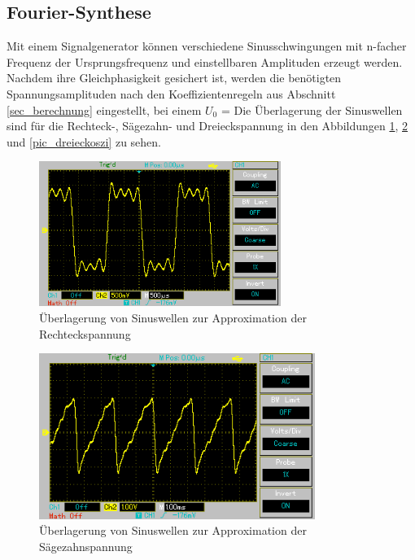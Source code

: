\subsection{Fourier-Synthese}
\label{sec_fourier}
Mit einem Signalgenerator können verschiedene Sinusschwingungen mit n-facher Frequenz der Ursprungsfrequenz und einstellbaren Amplituden
erzeugt werden. Nachdem ihre Gleichphasigkeit gesichert ist, werden die benötigten Spannungsamplituden nach den Koeffizientenregeln aus
Abschnitt \ref{sec_berechnung} eingestellt, bei einem $U_0$ =  Die Überlagerung der Sinuswellen sind für die Rechteck-, Sägezahn- und Dreieckspannung 
in den Abbildungen \ref{pic_rechteckoszi}, \ref{pic_saegzahnoszi} und \ref{pic_dreieckoszi} zu sehen.

\begin{figure}[H]
 \includegraphics[width = 0.7\textwidth]{pics/rechteck.png}
 \caption{Überlagerung von Sinuswellen zur Approximation der Rechteckspannung}
 \label{pic_rechteckoszi}
\end{figure}
\begin{figure}[H]
 \includegraphics[width = 0.8\textwidth]{pics/saegezahn.png}
 \caption{Überlagerung von Sinuswellen zur Approximation der Sägezahnspannung}
 \label{pic_saegzahnoszi}
\end{figure}
